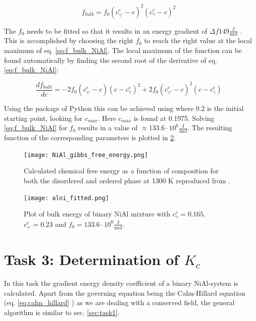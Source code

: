 \begin{equation}
	f_{bulk} = f_{0} (c_{\gamma '}^{e} - c)^{2}(c_{\gamma}^{e} - c)^{2} \label{eq:f_bulk_NiAl}
\end{equation}

The \( f_{0}\) needs to be fitted so that it results in an energy gradient of \(\Delta f 149 \frac{\mathrm{J}}{\mathrm{mol}} \) \cite{zaisera}. This is accomplished by choosing the right \(f_{0}\) to reach the right value at the local maximum of eq. \ref{eq:f_bulk_NiAl}. The local maximum of the function can be found automatically by finding the second root of the derivative of eq. \ref{eq:f_bulk_NiAl}:

\begin{equation}
	\frac{df_{bulk}}{dc} = -2 f_{0} (c_{\gamma '}^{e} - c)(c - c_{\gamma}^{e})^{2} + 2 f_{0} (c_{\gamma '}^{e} - c)^{2}(c - c_{\gamma}^{e})
\end{equation}

Using the  package of Python this can be achieved using  where 0.2 is the initial starting point, looking for \(c_{max}\). Here \(c_{max}\) is found at 0.1975. Solving \ref{eq:f_bulk_NiAl} for \(f_{0}\) results in a value of \(\approx 133.6 \cdot 10^{6} \frac{\mathrm{J}}{\mathrm{mol}}\).  The resulting function of the corresponding parameters is plotted in \ref{fig:alni_fitted}.


\begin{figure}[htb]
	\centering\texttt{[image: NiAl\_gibbs\_free\_energy.png]}\label{fig:AlNi_gibbs}
	\caption{Calculated chemical free energy as a function of composition for both the disordered and ordered phase at 1300 K reproduced from \cite{zhu2002}.} 
\end{figure}

\begin{figure}[htb]
	\centering
	\texttt{[image: alni\_fitted.png]}\label{fig:alni_fitted}
	\caption{Plot of bulk energy of binary NiAl mixture with \(c_{\gamma}^{e} = 0.165\),  \(c_{\gamma '}^{e} = 0.23\) and \(f_{0} = 133.6 \cdot 10^{6} \frac{\mathrm{J}}{\mathrm{mol}} \).}
\end{figure}

\section{Task 3: Determination of \(K_{c}\) }
In this task the gradient energy density coefficient of a binary NiAl-system is calculated. Apart from the governing equation being the Cahn-Hillard equation (eq. \ref{eq:cahn_hillard} ) as we are dealing with a conserved field, the general algorithm is similar to sec. \ref{sec:task1}. 

